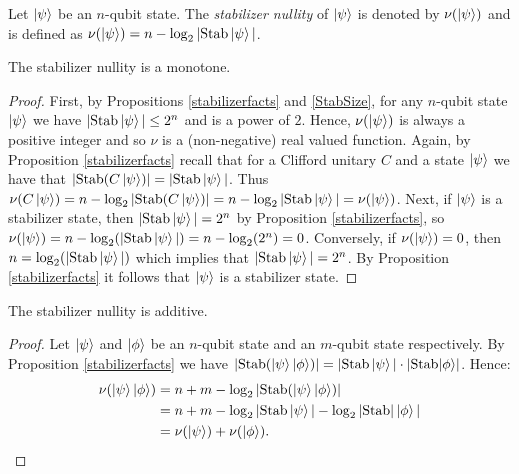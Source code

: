 \documentclass[12pt]{dalthesis}
\begin{document}
\begin{definition}
Let $\ket{\psi}$ be an  $n$-qubit state. The \emph{stabilizer nullity} of $\ket{\psi}$ is denoted by $\nu(\ket{\psi})$ and is defined as $\nu(\ket{\psi}) = n - \log_2 |\text{Stab}\ket{\psi}|$.
\end{definition}

\begin{proposition}
The stabilizer nullity is a monotone.
\end{proposition}
\begin{proof}
First, by Propositions \ref{stabilizerfacts} and \ref{StabSize}, for any $n$-qubit state $\ket{\psi}$ we have $|\mathrm{Stab} \ket{\psi}| \leq 2^n$ and is a power of $2$. Hence, $\nu (\ket{\psi})$ is always a positive integer and so $\nu$ is a (non-negative) real valued function. Again, by Proposition \ref{stabilizerfacts} recall that for a Clifford unitary $C$ and a state $\ket{\psi}$ we have that $|\mathrm{Stab}(C\ket{\psi})| = |\mathrm{Stab}\ket{\psi}|$. Thus $\nu(C\ket{\psi}) = n - \log_2|\mathrm{Stab}(C\ket{\psi})| = n - \log_2|\mathrm{Stab}\ket{\psi}| = \nu(\ket{\psi})$. Next, if $\ket{\psi}$ is a stabilizer state, then $|\mathrm{Stab}\ket{\psi}| = 2^n$ by Proposition \ref{stabilizerfacts}, so $\nu(\ket{\psi}) = n - \log_2(|\mathrm{Stab}\ket{\psi}|) =  n - \log_2(2^n) = 0$. Conversely, if $\nu (\ket{\psi}) = 0$, then $n = \log_2(|\mathrm{Stab}\ket{\psi}|)$ which implies that $|\mathrm{Stab}\ket{\psi}| = 2^n$. By Proposition \ref{stabilizerfacts} it follows that $\ket{\psi}$ is a stabilizer state.
\end{proof}

\begin{proposition}
The stabilizer nullity is additive.
\end{proposition}
\begin{proof}
Let $\ket{\psi}$ and $\ket{\phi}$ be an $n$-qubit state and an $m$-qubit state respectively. By Proposition \ref{stabilizerfacts} we have $|\mathrm{Stab}(\ket{\psi} \ket{\phi})| = |\mathrm{Stab}\ket{\psi}| \cdot |\mathrm{Stab}{\ket{\phi}}|$. Hence:
\begin{equation*}
\begin{split}
\nu (\ket{\psi}\ket{\phi}) & = n + m - \log_2 |\mathrm{Stab} (\ket{\psi}\ket{\phi})| \\
& = n + m - \log_2 |\mathrm{Stab} \ket{\psi}| - \log_2|\mathrm{Stab}|\ket{\phi}| \\
& = \nu(\ket{\psi}) + \nu (\ket{\phi}).
\end{split}
\end{equation*}
\end{proof}
\end{document}
